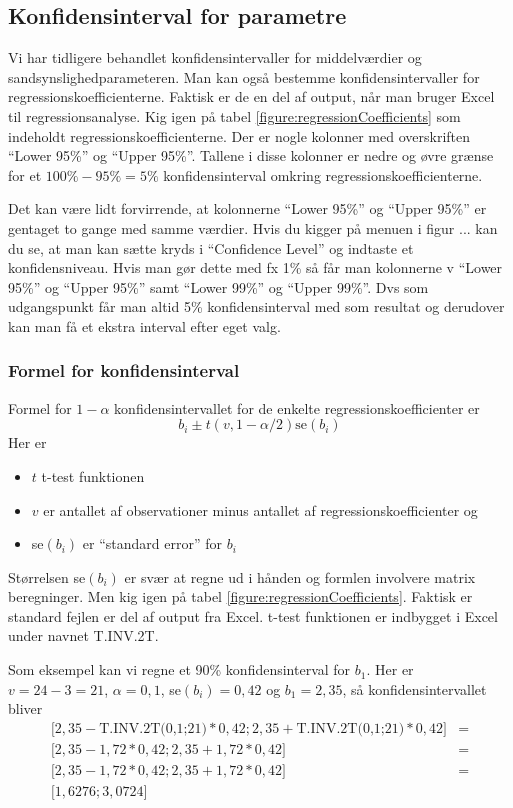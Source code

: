 \subsection{Konfidensinterval for parametre}
Vi har tidligere behandlet konfidensintervaller for middelværdier og sandsynslighedparameteren. Man kan også bestemme konfidensintervaller for regressionskoefficienterne. Faktisk er de en del af output, når man bruger Excel til regressionsanalyse. Kig igen på tabel \ref{figure:regressionCoefficients} som indeholdt regressionskoefficienterne. Der er nogle kolonner med overskriften ``Lower 95\%'' og ``Upper 95\%''. Tallene i disse kolonner er nedre og øvre grænse for et \(100\% - 95\% = 5\%\) konfidensinterval omkring regressionskoefficienterne.

Det kan være lidt forvirrende, at kolonnerne ``Lower 95\%'' og ``Upper 95\%'' er gentaget to gange med samme værdier. Hvis du kigger på menuen i figur ... kan du se, at man kan sætte kryds i ``Confidence Level'' og indtaste et konfidensniveau. Hvis man gør dette med fx 1\% så får man kolonnerne v ``Lower 95\%'' og ``Upper 95\%'' samt  ``Lower 99\%'' og ``Upper 99\%''. Dvs som udgangspunkt får man altid 5\% konfidensinterval med som resultat og derudover kan man få et ekstra interval efter eget valg.

\subsubsection{Formel for konfidensinterval}
Formel for \(1 - \alpha\) konfidensintervallet for de enkelte regressionskoefficienter er
\begin{displaymath}
    b_i \pm t(v, 1 - \alpha / 2) \textrm{se}(b_i)
\end{displaymath}
Her er
\begin{itemize}
    \item \(t\) t-test funktionen
    \item \(v\) er antallet af observationer minus antallet af regressionskoefficienter og
    \item se\((b_i)\) er ``standard error'' for \(b_i\)
\end{itemize}
Størrelsen se\((b_i)\) er svær at regne ud i hånden og formlen involvere matrix beregninger. Men kig igen på tabel \ref{figure:regressionCoefficients}. Faktisk er standard fejlen er del af output fra Excel. t-test funktionen er indbygget i Excel under navnet T.INV.2T.

Som eksempel kan vi regne et 90\% konfidensinterval for \(b_1\). Her er \(v=24-3=21\), \(\alpha=0,1\), se\((b_i) = 0,42\) og \(b_1=2,35\), så konfidensintervallet bliver
\begin{equation}
\begin{align}
    \Big[2,35 - \textrm{T.INV.2T(0,1;21)} * 0,42 ;  2,35 + \textrm{T.INV.2T(0,1;21)} * 0,42 \Big] &= \\
    \Big[2,35 - 1,72 * 0,42 ;  2,35 + 1,72 * 0,42 \Big] &= \\
    \Big[2,35 - 1,72 * 0,42 ;  2,35 + 1,72 * 0,42 \Big] &= \\
    \Big[1,6276 ; 3,0724\Big]
\end{align}
\end{equation}

